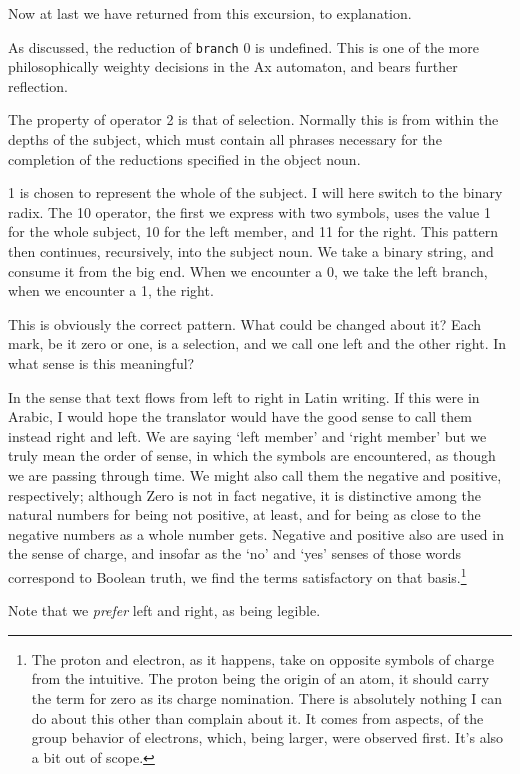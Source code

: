 \documentclass[twoside]{article}
\begin{document}
Now at last we have returned from this excursion, to explanation.

As discussed, the reduction of \texttt{branch} 0 is undefined. This is one of the more philosophically weighty decisions in the Ax automaton, and bears further reflection.

The property of operator 2 is that of selection. Normally this is from within the depths of the subject, which must contain all phrases necessary for the completion of the reductions specified in the object noun.

1 is chosen to represent the whole of the subject. I will here switch to the binary radix. The 10 operator, the first we express with two symbols, uses the value 1 for the whole subject, 10 for the left member, and 11 for the right. This pattern then continues, recursively, into the subject noun. We take a binary string, and consume it from the big end. When we encounter a 0, we take the left branch, when we encounter a 1, the right.

This is obviously the correct pattern. What could be changed about it? Each mark, be it zero or one, is a selection, and we call one left and the other right. In what sense is this meaningful?

In the sense that text flows from left to right in Latin writing. If this were in Arabic, I would hope the translator would have the good sense to call them instead right and left. We are saying `left member' and `right member' but we truly mean the order of sense, in which the symbols are encountered, as though we are passing through time. We might also call them the negative and positive, respectively; although Zero is not in fact negative, it is distinctive among the natural numbers for being not positive, at least, and for being as close to the negative numbers as a whole number gets. Negative and positive also are used in the sense of charge, and insofar as the `no' and `yes' senses of those words correspond to Boolean truth, we find the terms satisfactory on that basis.\footnote{The proton and electron, as it happens, take on opposite symbols of charge from the intuitive. The proton being the origin of an atom, it should carry the term for zero as its charge nomination. There is absolutely nothing I can do about this other than complain about it. It comes from aspects, of the group behavior of electrons, which, being larger, were observed first. It's also a bit out of scope.}

Note that we \emph{prefer} left and right, as being legible.
\end{document}
